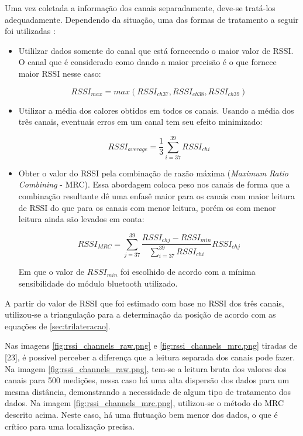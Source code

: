 Uma vez coletada a informação dos canais separadamente, deve-se tratá-los adequadamente. Dependendo da situação, uma das formas de tratamento a seguir foi utilizadas : 

\begin{itemize}

    \item Utililzar dados somente do canal que está fornecendo o maior valor de RSSI. O canal que é considerado como dando a maior precisão é o que fornece maior RSSI nesse caso:
    
    \begin{equation}
        RSSI_{max} = max(RSSI_{ch37}, RSSI_{ch38}, RSSI_{ch39})
    \end{equation}

    \item  Utilizar a média dos calores obtidos em todos os canais. Usando a média dos três canais, eventuais erros em um canal tem seu efeito minimizado:
    
    \begin{equation}
        RSSI_{average} = \frac{1}{3} \sum_{i=37}^{39}  RSSI_{ch i}
    \end{equation}
    

    \item Obter o valor do RSSI pela combinação de razão máxima (\textit{Maximum Ratio Combining} - MRC). Essa abordagem coloca peso nos canais de forma que a combinação resultante dê uma enfasê maior para os canais com maior leitura de RSSI do que para os canais com menor leitura, porém os com menor leitura ainda são levados em conta:

    \begin{equation}
        RSSI_{MRC} = \sum_{j=37}^{39} \frac{RSSI_{ch j} - RSSI_{min}}{\sum_{i=37}^{39}  RSSI_{ch i}} RSSI_{ch j}
    \end{equation}

    Em que o valor de \( RSSI_{min} \) foi escolhido de acordo com a mínima sensibilidade do módulo bluetooth utilizado.


\end{itemize}

A partir do valor de RSSI que foi estimado com base no RSSI dos três canais, utilizou-se a triangulação para a determinação da posição de acordo com as equações de \ref{sec:trilateracao}.

Nas imagens \ref{fig:rssi_channels_raw.png} e \ref{fig:rssi_channels_mrc.png} tiradas de [23], é possível perceber a diferença que a leitura separada dos canais pode fazer. Na imagem \ref{fig:rssi_channels_raw.png}, tem-se a leitura bruta dos valores dos canais para 500 medições, nessa caso há uma alta dispersão dos dados para um mesma distância, demonstrando a necessidade de algum tipo de tratamento dos dados.
Na imagem \ref{fig:rssi_channels_mrc.png}, utilizou-se o método do MRC descrito acima. Neste caso, há uma flutuação bem menor dos dados, o que é crítico para uma localização precisa.

